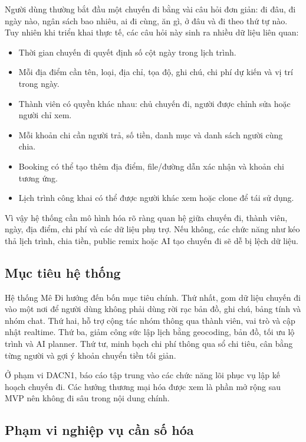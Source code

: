 \documentclass[a4paper]{report}
\newcommand{\ProjectName}{Mê Đi}
\begin{document}
Người dùng thường bắt đầu một chuyến đi bằng vài câu hỏi đơn giản: đi đâu, đi ngày nào, ngân sách bao nhiêu, ai đi cùng, ăn gì, ở đâu và đi theo thứ tự nào. Tuy nhiên khi triển khai thực tế, các câu hỏi này sinh ra nhiều dữ liệu liên quan:

\begin{itemize}
  \item Thời gian chuyến đi quyết định số cột ngày trong lịch trình.
  \item Mỗi địa điểm cần tên, loại, địa chỉ, tọa độ, ghi chú, chi phí dự kiến và vị trí trong ngày.
  \item Thành viên có quyền khác nhau: chủ chuyến đi, người được chỉnh sửa hoặc người chỉ xem.
  \item Mỗi khoản chi cần người trả, số tiền, danh mục và danh sách người cùng chia.
  \item Booking có thể tạo thêm địa điểm, file/đường dẫn xác nhận và khoản chi tương ứng.
  \item Lịch trình công khai có thể được người khác xem hoặc clone để tái sử dụng.
\end{itemize}

Vì vậy hệ thống cần mô hình hóa rõ ràng quan hệ giữa chuyến đi, thành viên, ngày, địa điểm, chi phí và các dữ liệu phụ trợ. Nếu không, các chức năng như kéo thả lịch trình, chia tiền, public remix hoặc AI tạo chuyến đi sẽ dễ bị lệch dữ liệu.

\subsection{Mục tiêu hệ thống}

Hệ thống \ProjectName{} hướng đến bốn mục tiêu chính. Thứ nhất, gom dữ liệu chuyến đi vào một nơi để người dùng không phải dùng rời rạc bản đồ, ghi chú, bảng tính và nhóm chat. Thứ hai, hỗ trợ cộng tác nhóm thông qua thành viên, vai trò và cập nhật realtime. Thứ ba, giảm công sức lập lịch bằng geocoding, bản đồ, tối ưu lộ trình và AI planner. Thứ tư, minh bạch chi phí thông qua sổ chi tiêu, cân bằng từng người và gợi ý khoản chuyển tiền tối giản.

Ở phạm vi DACN1, báo cáo tập trung vào các chức năng lõi phục vụ lập kế hoạch chuyến đi. Các hướng thương mại hóa được xem là phần mở rộng sau MVP nên không đi sâu trong nội dung chính.

\subsection{Phạm vi nghiệp vụ cần số hóa}
\end{document}
